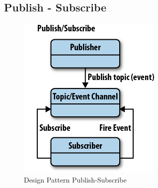 	\subsection{Publish - Subscribe}
	\begin{figure}[h!]
	\begin{center}
		\includegraphics[scale=1.2]{../images/publish-subscribe-pattern.png}
		\caption{Design Pattern Publish-Subscribe}
	\end{center}
	\end{figure}

